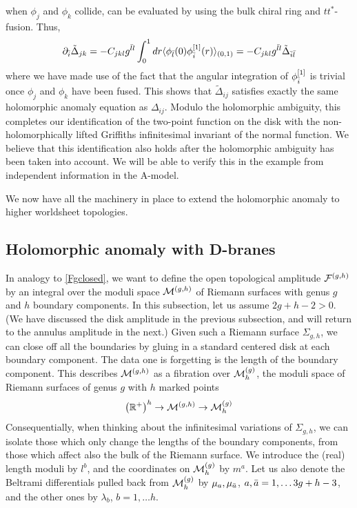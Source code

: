 when $\phi_j$ and $\phi_k$ collide, can be evaluated by using the bulk 
chiral ring and $tt^*$-fusion. Thus,
\begin{equation}
\partial_{\bar i} \tilde\Delta_{jk} = - C_{jkl} g^{{\bar l} l} 
\int_0^1 dr\langle \phi_{\bar l}(0) \phi_{\bar i}^{[1]}(r)\rangle_{(0,1)}
= - C_{jkl} g^{{\bar l} l} \tilde\Delta_{{\bar i}{\bar l}}
\end{equation}
where we have made use of the fact that the angular integration of 
$\phi_{\bar i}^{[1]}$ is trivial once $\phi_j$ and $\phi_k$ have been fused.
This shows that $\tilde\Delta_{ij}$ satisfies exactly the same holomorphic 
anomaly equation as $\Delta_{ij}$. Modulo the holomorphic ambiguity,
this completes our identification of the two-point function on the
disk with the non-holomorphically lifted Griffiths infinitesimal 
invariant of the normal function. We believe that this identification
also holds after the holomorphic ambiguity has been taken into account.
We will be able to verify this in the example from independent information 
in the A-model.

We now have all the machinery in place to extend the holomorphic
anomaly to higher worldsheet topologies.


\subsection{Holomorphic anomaly with D-branes}
\label{openhan}

In analogy to \eqref{Fgclosed}, we want to define the open topological 
amplitude ${{\cal F}}^{(g,h)}$ by an integral over the moduli space ${\cal M}^{(g,h)}$ of 
Riemann surfaces with genus $g$ and $h$ boundary components. In this 
subsection, let us assume $2g+h-2>0$. (We have discussed the disk 
amplitude in the previous subsection, and will return to the annulus 
amplitude in the next.) Given such a Riemann surface $\Sigma_{g,h}$, we 
can close off all the boundaries by gluing in a standard centered disk 
at each boundary component. The data one is forgetting is the length of
the boundary component. This describes ${\cal M}^{(g,h)}$ as a fibration over 
${\cal M}^{(g)}_{h}$, the moduli space of Riemann surfaces of genus $g$ with 
$h$ marked points
\begin{equation}
\eqlabel{fibration}
\bigl(\reals^+\bigr)^h\to\calm gh \to\calmc g_h
\end{equation}
Consequentially, when thinking about the infinitesimal variations of
$\Sigma_{g,h}$, we can isolate those which only change the lengths of
the boundary components, from those which affect also the bulk of the
Riemann surface. We introduce the (real) length moduli by $l^b$, and the
coordinates on ${\cal M}^{(g)}_h$ by $m^a$. Let us also denote the Beltrami 
differentials pulled back from ${\cal M}^{(g)}_h$ by $\mu_a,\mu_{\bar a}$, $a,{\bar a}=1,
\ldots 3g+h-3$, and the other ones by $\lambda_b$, $b=1,\ldots h$.  

